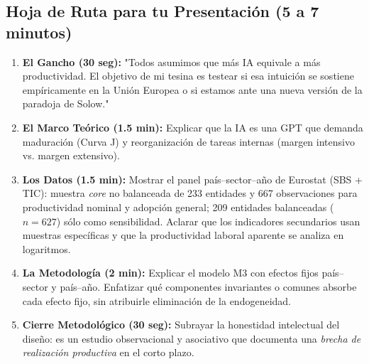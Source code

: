 \documentclass[12pt,a4paper]{article}
\begin{document}
\subsection{Hoja de Ruta para tu Presentación (5 a 7 minutos)}
\begin{enumerate}
  \item \textbf{El Gancho (30 seg):} "Todos asumimos que más IA equivale a más productividad. El objetivo de mi tesina es testear si esa intuición se sostiene empíricamente en la Unión Europea o si estamos ante una nueva versión de la paradoja de Solow."
  \item \textbf{El Marco Teórico (1.5 min):} Explicar que la IA es una GPT que demanda maduración (Curva J) y reorganización de tareas internas (margen intensivo vs. margen extensivo).
  \item \textbf{Los Datos (1.5 min):} Mostrar el panel país--sector--año de Eurostat (SBS + TIC): muestra \textit{core} no balanceada de 233 entidades y 667 observaciones para productividad nominal y adopción general; 209 entidades balanceadas ($n=627$) sólo como sensibilidad. Aclarar que los indicadores secundarios usan muestras específicas y que la productividad laboral aparente se analiza en logaritmos.
  \item \textbf{La Metodología (2 min):} Explicar el modelo M3 con efectos fijos país--sector y país--año. Enfatizar qué componentes invariantes o comunes absorbe cada efecto fijo, sin atribuirle eliminación de la endogeneidad.
  \item \textbf{Cierre Metodológico (30 seg):} Subrayar la honestidad intelectual del diseño: es un estudio observacional y asociativo que documenta una \textit{brecha de realización productiva} en el corto plazo.
\end{enumerate}
\end{document}
